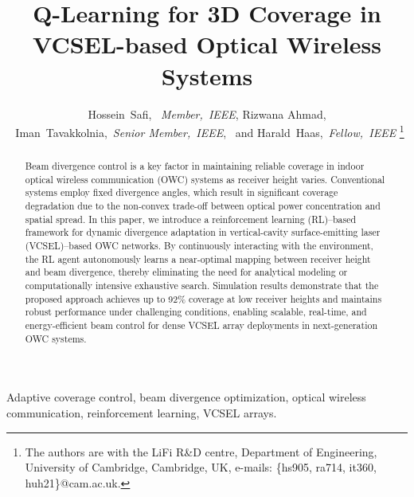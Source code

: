 \documentclass[twocolumn,twoside]{IEEEtran}
\theoremstyle{break}
\begin{document}
	\raggedbottom
	\makeatletter
	\def\fps@figure{!t} 
	\def\fps@table{!t}   
	\makeatother



\title{Q-Learning for 3D Coverage in VCSEL-based Optical Wireless Systems}
	
	\author{Hossein~Safi, ~{\it Member,~IEEE}, Rizwana Ahmad,\\~Iman~Tavakkolnia,~{\it Senior Member,~IEEE}, ~and Harald~Haas,~{\it Fellow,~IEEE}
		\thanks{The authors are with the LiFi R\&D centre, Department of Engineering, University of Cambridge, Cambridge, UK, e-mails: \{hs905, ra714, it360, huh21\}@cam.ac.uk.}} 

	
	
	\maketitle

	\begin{abstract}
		Beam divergence control is a key factor in maintaining reliable coverage in indoor optical wireless communication (OWC) systems as receiver height varies. Conventional systems employ fixed divergence angles, which result in significant coverage degradation due to the non-convex trade-off between optical power concentration and spatial spread. In this paper, we introduce a reinforcement learning (RL)–based framework for dynamic divergence adaptation in vertical-cavity surface-emitting laser (VCSEL)–based OWC networks. By continuously interacting with the environment, the RL agent autonomously learns a near-optimal mapping between receiver height and beam divergence, thereby eliminating the need for analytical modeling or computationally intensive exhaustive search. Simulation results demonstrate that the proposed approach achieves up to 92\% coverage at low receiver heights and maintains robust performance under challenging conditions, enabling scalable, real-time, and energy-efficient beam control for dense VCSEL array deployments in next-generation OWC systems.
	\end{abstract}
	\begin{IEEEkeywords}
	Adaptive coverage control, beam divergence optimization, optical wireless communication, reinforcement learning, VCSEL arrays.
	\end{IEEEkeywords}
	\IEEEpeerreviewmaketitle
	
\end{document}

